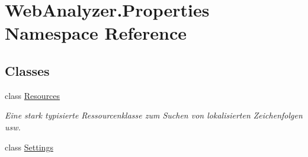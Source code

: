 \hypertarget{namespace_web_analyzer_1_1_properties}{}\section{Web\+Analyzer.\+Properties Namespace Reference}
\label{namespace_web_analyzer_1_1_properties}
\subsection*{Classes}
\begin{DoxyCompactItemize}
\item 
class \hyperlink{class_web_analyzer_1_1_properties_1_1_resources}{Resources}
\begin{DoxyCompactList}\small\item\em Eine stark typisierte Ressourcenklasse zum Suchen von lokalisierten Zeichenfolgen usw. \end{DoxyCompactList}\item 
class \hyperlink{class_web_analyzer_1_1_properties_1_1_settings}{Settings}
\end{DoxyCompactItemize}
